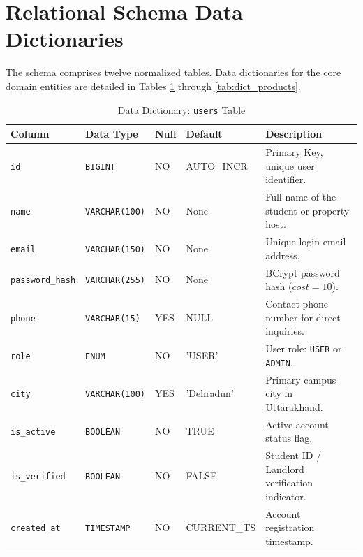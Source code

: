 \section{Relational Schema Data Dictionaries}
The schema comprises twelve normalized tables. Data dictionaries for the core domain entities are detailed in Tables \ref{tab:dict_users} through \ref{tab:dict_products}.

\begin{table}[htbp]
\centering
\caption{Data Dictionary: \texttt{users} Table}
\label{tab:dict_users}
\footnotesize
\begin{tabularx}{\textwidth}{lp{2.5cm}lp{2.0cm}X}
\toprule
\textbf{Column} & \textbf{Data Type} & \textbf{Null} & \textbf{Default} & \textbf{Description} \\
\midrule
\texttt{id} & \texttt{BIGINT} & NO & AUTO\_INCR & Primary Key, unique user identifier. \\
\texttt{name} & \texttt{VARCHAR(100)} & NO & None & Full name of the student or property host. \\
\texttt{email} & \texttt{VARCHAR(150)} & NO & None & Unique login email address. \\
\texttt{password\_hash} & \texttt{VARCHAR(255)} & NO & None & BCrypt password hash ($cost=10$). \\
\texttt{phone} & \texttt{VARCHAR(15)} & YES & NULL & Contact phone number for direct inquiries. \\
\texttt{role} & \texttt{ENUM} & NO & 'USER' & User role: \texttt{USER} or \texttt{ADMIN}. \\
\texttt{city} & \texttt{VARCHAR(100)} & YES & 'Dehradun' & Primary campus city in Uttarakhand. \\
\texttt{is\_active} & \texttt{BOOLEAN} & NO & TRUE & Active account status flag. \\
\texttt{is\_verified} & \texttt{BOOLEAN} & NO & FALSE & Student ID / Landlord verification indicator. \\
\texttt{created\_at} & \texttt{TIMESTAMP} & NO & CURRENT\_TS & Account registration timestamp. \\
\bottomrule
\end{tabularx}
\end{table}

